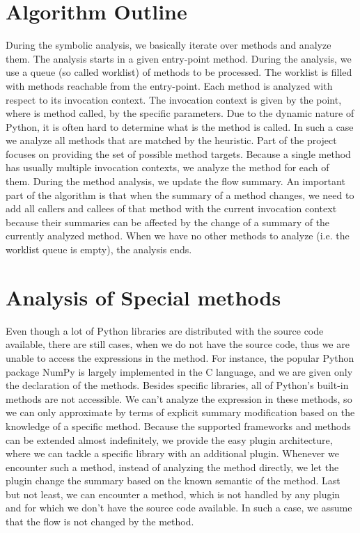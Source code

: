 \section{Algorithm Outline}
During the symbolic analysis, we basically iterate over methods and analyze them. The analysis starts in a given entry-point method. During the analysis, we use a queue (so called worklist) of methods to be processed. The worklist is filled with methods reachable from the entry-point. Each method is analyzed with respect to its invocation context. The invocation context is given by the point, where is method called, by the specific parameters. Due to the dynamic nature of Python, it is often hard to determine what is the method is called. In such a case we analyze all methods that are matched by the heuristic. Part of the project focuses on providing the set of possible method targets. Because a single method has usually multiple invocation contexts, we analyze the method for each of them. During the method analysis, we update the flow summary. An important part of the algorithm is that when the summary of a method changes, we need to add all callers and callees of that method with the current invocation context because their
summaries can be affected by the change of a summary of the currently analyzed method. When we have no other methods to analyze (i.e. the worklist queue is empty), the analysis ends.

\section{Analysis of Special methods}
Even though a lot of Python libraries are distributed with the source code available, there are still cases, when we do not have the source code, thus we are unable to access the expressions in the method. For instance, the popular Python package NumPy is largely implemented in the C language, and we are given only the declaration of the methods. Besides specific libraries, all of Python's built-in methods are not accessible. We can't analyze the expression in these methods, so we can only approximate by terms of explicit summary modification based on the knowledge of a specific method. Because the supported frameworks and methods can be extended almost indefinitely, we provide the easy plugin architecture, where we can tackle a specific library with an additional plugin. Whenever we encounter such a method, instead of analyzing the method directly, we let the plugin change the summary based on the known semantic of the method. Last but not least, we can encounter a method, which is not handled by any plugin and for which we don't have the source code available. In such a case, we assume that the flow is not changed by the method.

